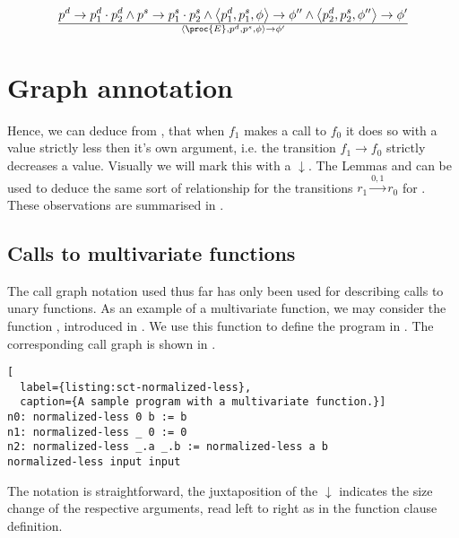 \begin{equation}
{
    p^d\rightarrow p^d_1\cdot p^d_2
  \wedge
    p^s\rightarrow p^s_1\cdot p^s_2
  \wedge
    \left\langle p^d_1, p^s_1, \phi\right\rangle
    \rightarrow
    \phi''
  \wedge
    \left\langle p^d_2, p^s_2, \phi''\right\rangle
    \rightarrow
    \phi'
}\over{
  \left\langle\proc{E},p^d,p^s,\phi\right\rangle
  \rightarrow
  \phi'
}
\end{equation}

\section{Graph annotation}

Hence, we can deduce from , that when $f_1$ makes a
call to $f_0$ it does so with a value strictly less then it's own argument,
i.e. the transition $f_1\rightarrow f_0$ strictly decreases a value. Visually
we will mark this with a $\downarrow$. The Lemmas 
and  can be used to deduce the same sort of
relationship for the transitions $r_1\xrightarrow{0,1} r_0$ for
. These observations are summarised in
.



\subsection{Calls to multivariate functions}

The call graph notation used thus far has only been used for describing calls
to unary functions. As an example of a multivariate function, we may consider
the function , introduced in
. We use this function to define the program in
. The corresponding call graph is shown in
.

\begin{lstlisting}[
  label={listing:sct-normalized-less},
  caption={A sample program with a multivariate function.}]
n0: normalized-less 0 b := b
n1: normalized-less _ 0 := 0
n2: normalized-less _.a _.b := normalized-less a b
normalized-less input input
\end{lstlisting}



The notation is straightforward, the juxtaposition of the $\downarrow$
indicates the size change of the respective arguments, read left to right as in
the function clause definition.

